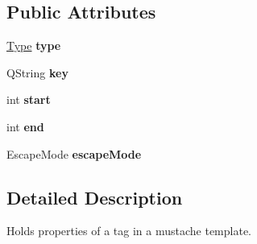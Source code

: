 \subsection*{Public Attributes}
\begin{DoxyCompactItemize}
\item 
\hypertarget{structMustache_1_1Tag_ad58b3b921b7e84c31efd88864c2040d4}{\hyperlink{structMustache_1_1Tag_ab702ed1288811f8bb16d76babfdb6472}{Type} {\bfseries type}}\label{structMustache_1_1Tag_ad58b3b921b7e84c31efd88864c2040d4}

\item 
\hypertarget{structMustache_1_1Tag_a25f46abd595426bc00230f69215db567}{Q\+String {\bfseries key}}\label{structMustache_1_1Tag_a25f46abd595426bc00230f69215db567}

\item 
\hypertarget{structMustache_1_1Tag_a4f967c59794b9dd5d711fa7a1d5aff43}{int {\bfseries start}}\label{structMustache_1_1Tag_a4f967c59794b9dd5d711fa7a1d5aff43}

\item 
\hypertarget{structMustache_1_1Tag_a9fc4a5ccee302e0bd9833ec2dd30bc3d}{int {\bfseries end}}\label{structMustache_1_1Tag_a9fc4a5ccee302e0bd9833ec2dd30bc3d}

\item 
\hypertarget{structMustache_1_1Tag_a2ce4c079ced32e8e4cadeca893a886a2}{Escape\+Mode {\bfseries escape\+Mode}}\label{structMustache_1_1Tag_a2ce4c079ced32e8e4cadeca893a886a2}

\end{DoxyCompactItemize}


\subsection{Detailed Description}
Holds properties of a tag in a mustache template. 

